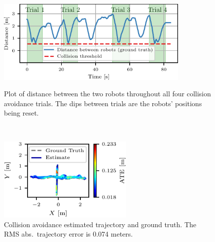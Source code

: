 \begin{figure}[h]
    \centering
    \captionsetup{format=plain, skip=0.5em}
    \begin{minipage}[b]{0.56\linewidth}
        \centering
        \includegraphics[height=1.6in]{figures/mar25_1_distance_plot.pdf}

        \caption{Plot of distance between the two robots throughout all four collision avoidance trials. The dips between trials are the robots' positions being reset.}
        \label{fig:collision-avoidance-distance-plot}
    \end{minipage}\hfill%
    ~
    \begin{minipage}[b]{0.42\linewidth}
        \centering
        \includegraphics[height=1.6in]{figures/mar25_1_trajectory.pdf}
        \caption{Collision avoidance estimated trajectory and ground truth. The RMS abs.\ trajectory error is 0.074 meters.}
        \label{fig:collision-avoidance-traj}
    \end{minipage}
\end{figure}




